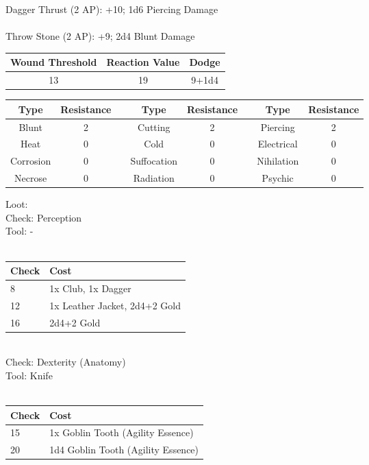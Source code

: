 Dagger Thrust (2 AP): +10; 1d6 Piercing Damage\\
\\
Throw Stone (2 AP): +9; 2d4 Blunt Damage\\
\bigbreak
\begin{minipage}[H]{1\textwidth}
	\centering
	\begin{tabular}[c]{|c | c | c|}
		\hline
		Wound Threshold & Reaction Value & Dodge\\
		\hline
		13 & 19 & 9+1d4\\
		\hline
	\end{tabular}
\end{minipage}
\bigbreak
\noindent
\begin{minipage}[H]{1\textwidth}
	\centering
	\begin{tabular}[c]{|c | c | c | c | c | c | c | c|}  
		\hline
		Type & Resistance && Type & Resistance && Type & Resistance\\
		\hline
		Blunt & 2 && 
		Cutting & 2 && 
		Piercing & 2\\
		Heat & 0 && 
		Cold & 0 && 
		Electrical & 0\\
		Corrosion & 0 && 
		Suffocation & 0 && 
		Nihilation & 0 \\
		Necrose & 0 && 
		Radiation & 0 && 
		Psychic & 0\\
		\hline
	\end{tabular}
\end{minipage}
\bigbreak
\noindent
Loot:\\
Check: Perception\\
Tool: -\\
\\
\begin{minipage}{0.8\textwidth}
	\begin{tabular}{|l | l|}
		\hline
		Check & Cost\\
		\hline
		8 & 1x Club, 1x Dagger\\
		12 & 1x Leather Jacket, 2d4+2 Gold\\
		16 & 2d4+2 Gold\\
		\hline
	\end{tabular}
\end{minipage}
\\
Check: Dexterity (Anatomy)\\
Tool: Knife\\
\\
\begin{minipage}{0.8\textwidth}
	\begin{tabular}{|l | l|}
		\hline
		Check & Cost\\
		\hline
		15 & 1x Goblin Tooth (Agility Essence)\\
		20 & 1d4 Goblin Tooth (Agility Essence)\\
		\hline
	\end{tabular}
\end{minipage}
\pagebreak